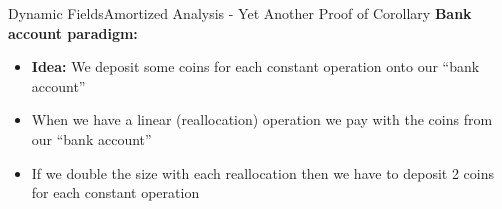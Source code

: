 
\begin{frame}{Dynamic Fields}{Amortized Analysis -
    Yet Another Proof of Corollary}
  \textbf{Bank account paradigm:}
  \begin{itemize}
    \item
      \textbf{Idea:}
      We deposit some coins for each constant operation onto our
      \enquote{bank account}
    \item
      When we have a linear (reallocation) operation we pay with the coins
      from our \enquote{bank account}
    \item
      If we double the size with each reallocation then we have to deposit
      2 coins for each constant operation
  \end{itemize}
\end{frame}


